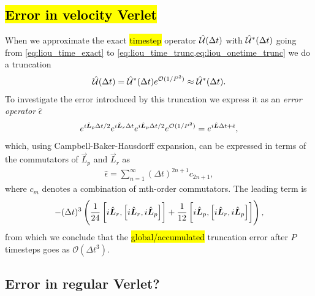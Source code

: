 \subsection[Error in velocity Verlet]{\hl{Error in velocity Verlet}\label{subsec:verlet_error_liouville}}
\newcommand{\errop}{\hat{\epsilon}}
When we approximate the exact \hl{timestep} operator $\hat{\mathcal{U}} (\Delta t)$ with $\hat{\mathcal{U}}^*(\Delta t)$ going from \cref{eq:liou_time_exact} to \cref{eq:liou_time_trunc,eq:liou_onetime_trunc} we do a truncation 
\begin{align*}
    \hat{\mathcal{U}}(\Delta t) = \hat{\mathcal{U}}^*(\Delta t) e^{\mathcal{O}(1/P^2)} \approx \hat{\mathcal{U}}^*(\Delta t).
\end{align*}
To investigate the error introduced by this truncation we express it as an \emph{error operator} $\errop$
\begin{align*}
    e^{\Liou_p\Delta t/2} e^{\Liou_r \Delta t} e^{\Liou_p \Delta t/2} e^{\mathcal{O}(1/P^2)}
    = e^{\Liou \Delta t + \errop},
\end{align*}
which, using Campbell-Baker-Hausdorff expansion, can be expressed in terms of the commutators of $\vec L_p$ and $\vec L_r$ as
\begin{align*}
    \errop = \sum_{n=1}^\infty (\Delta t)^{2n+1} c_{2n+1},
\end{align*}
where $c_m$ denotes a combination of mth-order commutators. The leading term is
\begin{align*}
    -(\Delta t)^3 \left( \frac{1}{24} \left[ i\hat{\boldsymbol{L}}_r, \left[ i\hat{\boldsymbol{L}}_r, i\hat{\boldsymbol{L}}_p \right] \right] + \frac{1}{12} \left[ i\hat{\boldsymbol{L}}_p, \left[ i\hat{\boldsymbol{L}}_r, i\hat{\boldsymbol{L}}_p \right] \right] \right),
\end{align*}
from which we conclude that the \hl{global/accumulated} truncation error after $P$ timesteps goes as $\mathcal{O}(\Delta t^3)$.

\subsection{Error in regular Verlet?}












